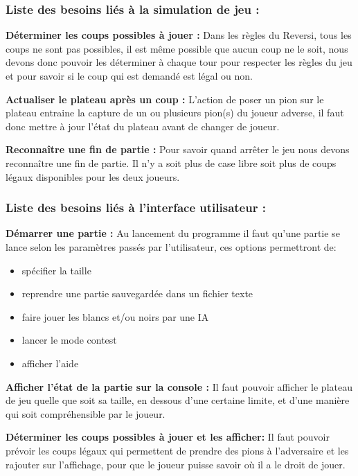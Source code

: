 \documentclass[12pt]{article}
\begin{document}
\subsubsection{Liste des besoins liés à la simulation de jeu :}

\textbf{Déterminer les coups possibles à jouer :}
Dans les règles du Reversi\cite{regle}, tous les coups ne sont pas possibles, il est même possible que aucun coup ne le soit, nous devons donc pouvoir les déterminer à chaque tour pour respecter les règles du jeu et pour savoir si le coup qui est demandé est légal ou non.

\textbf{Actualiser le plateau après un coup :}
L'action de poser un pion sur le plateau entraine la capture de un ou plusieurs pion(s) du joueur adverse, il faut donc mettre à jour l'état du plateau avant de changer de joueur.

\textbf{Reconnaître une fin de partie : }
Pour savoir quand arrêter le jeu nous devons reconnaître une fin de partie. Il n'y a soit plus de case libre soit plus de coups légaux disponibles pour les deux joueurs.

\subsubsection{Liste des besoins liés à l'interface utilisateur :}

\textbf{Démarrer une partie :}
Au lancement du programme il faut qu'une partie se lance selon les paramètres passés par l'utilisateur, ces options permettront de:
\begin{itemize}
\item spécifier la taille
\item reprendre une partie sauvegardée dans un fichier texte
\item faire jouer les blancs et/ou noirs par une IA
\item lancer le mode contest
\item afficher l'aide
\end{itemize}

\textbf{Afficher l'état de la partie sur la console :}
Il faut pouvoir afficher le plateau de jeu quelle que soit sa taille, en dessous d'une certaine limite, et d'une manière qui soit compréhensible par le joueur.

\textbf{Déterminer les coups possibles à jouer et les afficher:}
Il faut pouvoir prévoir les coups légaux qui permettent de prendre des pions à l'adversaire et les rajouter sur l’affichage, pour que le joueur puisse savoir où il a le droit de jouer.
\end{document}
